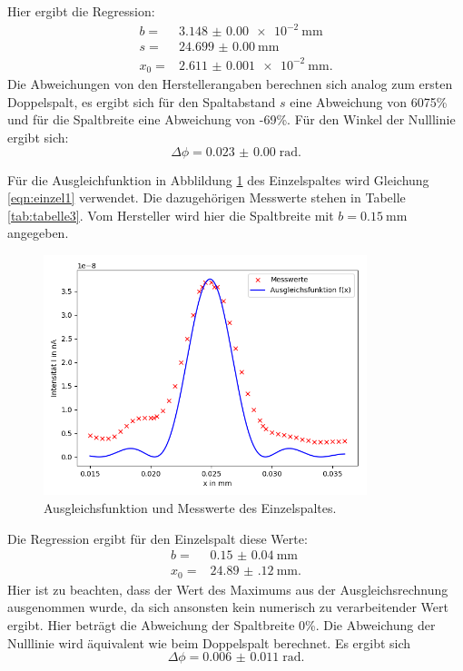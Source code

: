 Hier ergibt die Regression:
\begin{align*}
  b =&\SI{3.148(0)e-2}{\mm}\\
  s =&\SI{24.699(0)}{\mm}\\
  x_{0} =&\SI{2.611(1)e-2}{\mm}.
\end{align*}
Die Abweichungen von den Herstellerangaben berechnen sich analog zum
ersten Doppelspalt, es ergibt sich für den Spaltabstand $s$ eine Abweichung von
6075\% und für die Spaltbreite eine Abweichung von -69\%. Für den Winkel der
Nulllinie ergibt sich:
\begin{equation}
  \Delta \phi =\SI{0.023(0)}\; \text{rad}.
\end{equation}

Für die Ausgleichfunktion in Abblildung \ref{fig:plot3} des Einzelspaltes
wird Gleichung \ref{eqn:einzel1} verwendet.
Die dazugehörigen Messwerte stehen in Tabelle \ref{tab:tabelle3}.
Vom Hersteller wird hier die Spaltbreite mit $b=\SI{0,15}{\mm}$ angegeben.


\begin{figure}
  \centering
  \includegraphics[height=7cm]{Figure_4.png}
  \caption{Ausgleichsfunktion und Messwerte des Einzelspaltes.}
  \label{fig:plot3}
\end{figure}

Die Regression ergibt für den Einzelspalt diese Werte:
\begin{align*}
  b =&\SI{0.15(4)}{\mm}\\
  x_{0} =&\SI{24.89(12)}{\mm}.
\end{align*}
Hier ist zu beachten, dass der Wert des Maximums aus der Ausgleichsrechnung ausgenommen
wurde, da sich ansonsten kein numerisch zu verarbeitender Wert ergibt.
Hier beträgt die Abweichung der Spaltbreite 0\%.
Die Abweichung der Nulllinie wird äquivalent wie beim Doppelspalt berechnet.
Es ergibt sich
\begin{equation*}
  \Delta \phi= \SI{0.006(11)}\; \text{rad}.
\end{equation*}
